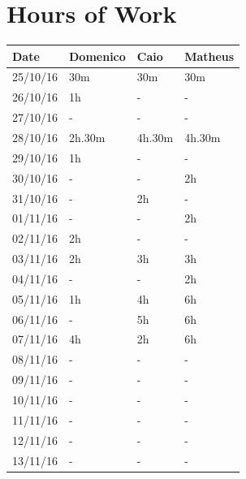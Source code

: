 \documentclass[a4paper]{article}
\begin{document}
\section{Hours of Work}
\begin{tabular}{ | l | l | l | l | }
\hline
	\textbf {Date} & \textbf {Domenico} & \textbf {Caio} & \textbf {Matheus} \\ \hline
	25/10/16& 30m & 30m & 30m \\ \hline
	26/10/16& 1h & -  & -  \\ \hline
	27/10/16&  - & - & -  \\ \hline
	28/10/16& 2h.30m & 4h.30m & 4h.30m \\ \hline
	29/10/16& 1h & -  & - \\ \hline
	30/10/16&  - & - & 2h\\ \hline
	31/10/16&  - & 2h & - \\ \hline
	01/11/16&  - & - & 2h \\ \hline
	02/11/16&  2h & - & - \\ \hline
	03/11/16&  2h & 3h & 3h \\ \hline
	04/11/16&  - & - & 2h\\ \hline
	05/11/16&  1h & 4h &  6h\\ \hline
	06/11/16&  - & 5h & 6h\\ \hline
	07/11/16& 4h & 2h & 6h \\ \hline
	08/11/16&  - & - & - \\ \hline
	09/11/16&  - & - & - \\ \hline
	10/11/16&  - & - & - \\ \hline
	11/11/16&  - & - & - \\ \hline
	12/11/16&  - & - & - \\ \hline
	13/11/16&  - & - & - \\ \hline
\end{tabular}

\newpage
\end{document}
